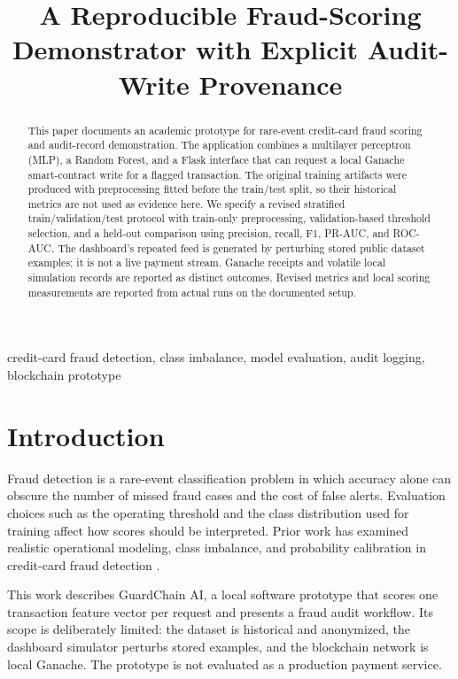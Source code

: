\documentclass[conference]{IEEEtran}
\title{A Reproducible Fraud-Scoring Demonstrator with Explicit Audit-Write Provenance}
\author{\IEEEauthorblockN{Author names withheld for draft review}
\IEEEauthorblockA{Department of Computer Science and Engineering\\Tula's Institute, Dehradun}}
\begin{document}
\maketitle

\begin{abstract}
This paper documents an academic prototype for rare-event credit-card fraud scoring and audit-record demonstration. The application combines a multilayer perceptron (MLP), a Random Forest, and a Flask interface that can request a local Ganache smart-contract write for a flagged transaction. The original training artifacts were produced with preprocessing fitted before the train/test split, so their historical metrics are not used as evidence here. We specify a revised stratified train/validation/test protocol with train-only preprocessing, validation-based threshold selection, and a held-out comparison using precision, recall, F1, PR-AUC, and ROC-AUC. The dashboard's repeated feed is generated by perturbing stored public dataset examples; it is not a live payment stream. Ganache receipts and volatile local simulation records are reported as distinct outcomes. Revised metrics and local scoring measurements are reported from actual runs on the documented setup.
\end{abstract}

\begin{IEEEkeywords}
credit-card fraud detection, class imbalance, model evaluation, audit logging, blockchain prototype
\end{IEEEkeywords}

\section{Introduction}
Fraud detection is a rare-event classification problem in which accuracy alone can obscure the number of missed fraud cases and the cost of false alerts. Evaluation choices such as the operating threshold and the class distribution used for training affect how scores should be interpreted. Prior work has examined realistic operational modeling, class imbalance, and probability calibration in credit-card fraud detection \cite{dalpozzolo2018,dalpozzolo2015}.

This work describes GuardChain AI, a local software prototype that scores one transaction feature vector per request and presents a fraud audit workflow. Its scope is deliberately limited: the dataset is historical and anonymized, the dashboard simulator perturbs stored examples, and the blockchain network is local Ganache. The prototype is not evaluated as a production payment service.
\end{document}
